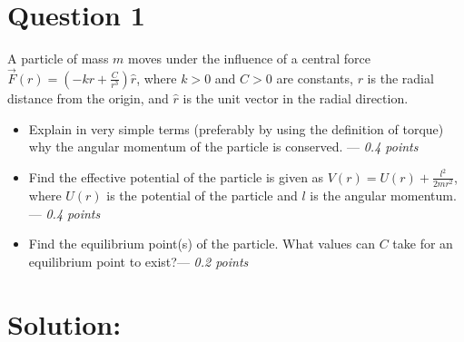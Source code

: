 \section*{Question 1}
A particle of mass $m$ moves under the influence of a central force $\vec{F}(r)=\left(-kr+\frac{C}{r^3}\right)\hat{r}$, where $k>0$ and $C>0$ are constants, $r$ is the radial distance from the origin, and $\hat{r}$ is the unit vector in the radial direction.
\begin{itemize}
    \item[(a)] Explain in very simple terms (preferably by using the definition of torque) why the angular momentum of the particle is conserved. --- \textit{0.4 points}
    \item[(b)] Find the effective potential of the particle is given as $V(r)=U(r)+\frac{l^2}{2mr^2}$, where $U(r)$ is the potential of the particle and $l$ is the angular momentum. --- \textit{0.4 points}
    \item[(c)] Find the equilibrium point(s) of the particle. What values can $C$ take for an equilibrium point to exist?--- \textit{0.2 points} 
\end{itemize}

\section*{Solution:}
